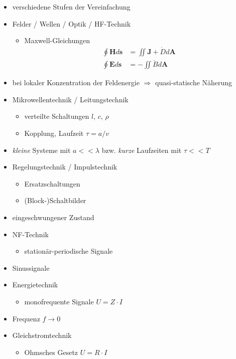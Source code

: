 \documentclass[
  ngerman,
  letterpaper,
]{scrbook}
\providecommand{\tightlist}{%
  \setlength{\itemsep}{0pt}\setlength{\parskip}{0pt}}
\begin{document}
\begin{itemize}
\item
  verschiedene Stufen der Vereinfachung
\item
  Felder / Wellen / Optik / HF-Technik

  \begin{itemize}
  \tightlist
  \item
    Maxwell-Gleichungen \begin{align}
    \oint \mathbf{H} d\mathbf{s} &= \iint \mathbf{J} + \dot{D} d\mathbf{A} \\
    \oint \mathbf{E} d\mathbf{s} &= - \iint \dot{B} d\mathbf{A}
    \end{align}
  \end{itemize}
\item
  bei lokaler Konzentration der Feldenergie \(\Rightarrow\)
  quasi-statische Näherung
\item
  Mikrowellentechnik / Leitungstechnik

  \begin{itemize}
  \item
    verteilte Schaltungen \(l\), \(c\), \(\rho\)
  \item
    Kopplung, Laufzeit \(\tau = a/v\)
  \end{itemize}
\item
  \emph{kleine} Systeme mit \(a << \lambda\) bzw. \emph{kurze}
  Laufzeiten mit \(\tau << T\)
\item
  Regelungstechnik / Impulstechnik

  \begin{itemize}
  \item
    Ersatzschaltungen
  \item
    (Block-)Schaltbilder
  \end{itemize}
\item
  eingeschwungener Zustand
\item
  NF-Technik

  \begin{itemize}
  \tightlist
  \item
    stationär-periodische Signale
  \end{itemize}
\item
  Sinussignale
\item
  Energietechnik

  \begin{itemize}
  \tightlist
  \item
    monofrequente Signale \(U = Z \cdot I\)
  \end{itemize}
\item
  Frequenz \(f \rightarrow 0\)
\item
  Gleichstromtechnik

  \begin{itemize}
  \tightlist
  \item
    Ohmsches Gesetz \(U = R \cdot I\)
  \end{itemize}
\end{itemize}
\end{document}
